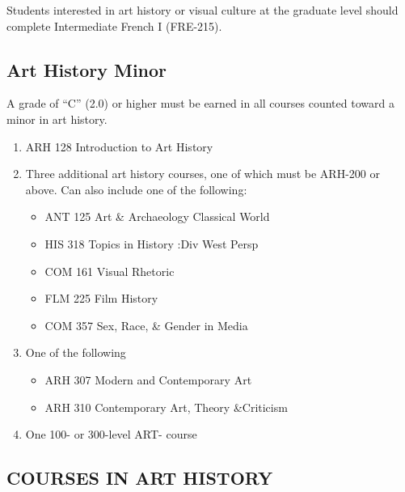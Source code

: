 \documentclass[
  letterpaper,
]{scrbook}
\providecommand{\tightlist}{%
  \setlength{\itemsep}{0pt}\setlength{\parskip}{0pt}}
\begin{document}
Students interested in art history or visual culture at the graduate
level should complete Intermediate French I (FRE-215).

\subsection{Art History Minor}\label{art-history-minor}

A grade of ``C'' (2.0) or higher must be earned in all courses counted
toward a minor in art history.

\begin{enumerate}
\def\labelenumi{\arabic{enumi}.}
\tightlist
\item
  ARH 128 Introduction to Art History\\
\item
  Three additional art history courses, one of which must be ARH-200 or
  above. Can also include one of the following:

  \begin{itemize}
  \tightlist
  \item
    ANT 125 Art \& Archaeology Classical World\\
  \item
    HIS 318 Topics in History :Div West Persp\\
  \item
    COM 161 Visual Rhetoric\\
  \item
    FLM 225 Film History\\
  \item
    COM 357 Sex, Race, \& Gender in Media\\
  \end{itemize}
\item
  One of the following

  \begin{itemize}
  \tightlist
  \item
    ARH 307 Modern and Contemporary Art
  \item
    ARH 310 Contemporary Art, Theory \&Criticism\\
  \end{itemize}
\item
  One 100- or 300-level ART- course
\end{enumerate}

\subsection{COURSES IN ART HISTORY}\label{courses-in-art-history}
\end{document}
